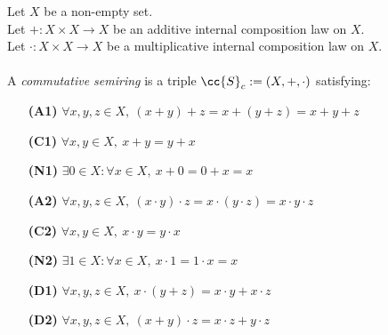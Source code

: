 \begin{definition-pre}
    \label{def:commutative_semiring}
    Let \(X\) be a non-empty set. \\
    Let \(+: X\times X \to X\) be an additive internal composition law on \(X\). \\
    Let \(\cdot: X\times X \to X\) be a multiplicative internal composition law on \(X\). \\\\
    A \textit{commutative semiring} is a triple \(\cc{S}_c:= (X, +, \cdot)\) satisfying:
    \begin{enumerate}
        \item [\textbf{(A1)}] \(\forall x,y,z\in X,\ (x+y)+z= x+(y+z) = x+y+z\)
        \item [\textbf{(C1)}] \(\forall x,y\in X,\ x+y = y+x\)
        \item [\textbf{(N1)}] \(\exists 0 \in X : \forall x \in X,\ x+0 = 0+x = x\)
        \item [\textbf{(A2)}] \(\forall x,y,z\in X,\ (x\cdot y)\cdot z= x\cdot(y\cdot z) = x\cdot y\cdot z\)
        \item [\textbf{(C2)}] \(\forall x,y\in X,\ x\cdot y = y\cdot x\)
        \item [\textbf{(N2)}] \(\exists 1 \in X : \forall x \in X,\ x\cdot1 = 1\cdot x = x\)
        \item [\textbf{(D1)}] \(\forall x,y,z \in X,\ x\cdot(y+z)=x\cdot y+x\cdot z\)
        \item [\textbf{(D2)}] \(\forall x,y,z \in X,\ (x+y)\cdot z=x\cdot z+y\cdot z\)
    \end{enumerate}
\end{definition-pre}

